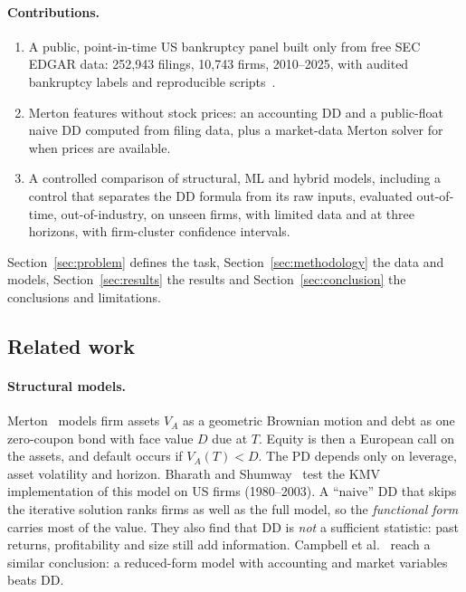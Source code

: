 \paragraph{Contributions.}
\begin{enumerate}
  \item A public, point-in-time US bankruptcy panel built only from free SEC EDGAR data: 252,943 filings,
        10,743 firms, 2010--2025, with audited bankruptcy labels and reproducible scripts~\cite{repo}.
  \item Merton features without stock prices: an accounting DD and a public-float naive DD computed from
        filing data, plus a market-data Merton solver for when prices are available.
  \item A controlled comparison of structural, ML and hybrid models, including a control that separates the
        DD formula from its raw inputs, evaluated out-of-time, out-of-industry, on unseen firms, with
        limited data and at three horizons, with firm-cluster confidence intervals.
\end{enumerate}
Section~\ref{sec:problem} defines the task, Section~\ref{sec:methodology} the data and models,
Section~\ref{sec:results} the results and Section~\ref{sec:conclusion} the conclusions and limitations.

\subsection{Related work}
\label{sec:related}

\paragraph{Structural models.} Merton~\cite{merton1974} models firm assets $V_A$ as a geometric Brownian
motion and debt as one zero-coupon bond with face value $D$ due at $T$. Equity is then a European call on
the assets, and default occurs if $V_A(T)<D$. The PD depends only on leverage, asset volatility and horizon.
Bharath and Shumway~\cite{bharath2008} test the KMV implementation of this model on US firms (1980--2003).
A ``naive'' DD that skips the iterative solution ranks firms as well as the full model, so the
\emph{functional form} carries most of the value. They also find that DD is \emph{not} a sufficient
statistic: past returns, profitability and size still add information. Campbell et al.~\cite{campbell2008}
reach a similar conclusion: a reduced-form model with accounting and market variables beats DD.

